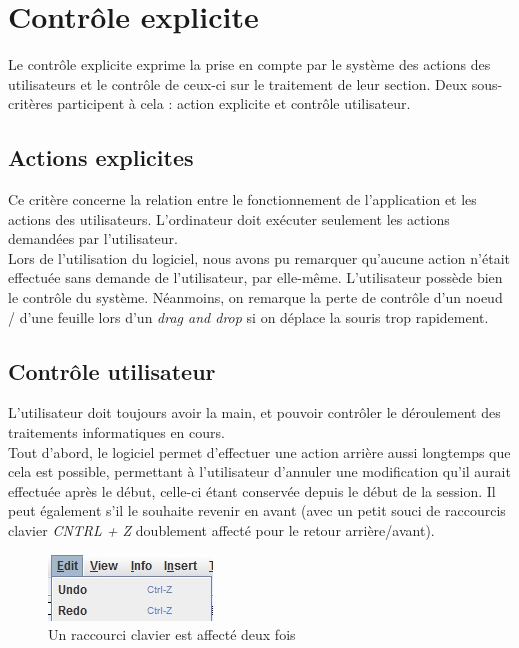 \documentclass[12pt, a4paper]{article}
\begin{document}
\section{Contrôle explicite}
Le contrôle explicite exprime la prise en compte par le système des actions des utilisateurs et le contrôle de ceux-ci sur le traitement de leur section. Deux sous-critères participent à cela : action explicite et contrôle utilisateur.
\subsection{Actions explicites}
Ce critère concerne la relation entre le fonctionnement de l'application et les actions des utilisateurs. L'ordinateur doit exécuter seulement les actions demandées par l'utilisateur.\\


Lors de l'utilisation du logiciel, nous avons pu remarquer qu'aucune action n'était effectuée sans demande de l'utilisateur, par elle-même. L'utilisateur possède bien le contrôle du système. Néanmoins, on remarque la perte de contrôle d'un noeud / d'une feuille lors d'un \emph{drag and drop} si on déplace la souris trop rapidement.

\subsection{Contrôle utilisateur}
L'utilisateur doit toujours avoir la main, et pouvoir contrôler le déroulement des traitements informatiques en cours. \\


Tout d'abord, le logiciel permet d'effectuer une action arrière aussi longtemps que cela est possible, permettant à l'utilisateur d'annuler une modification qu'il aurait effectuée après le début, celle-ci étant conservée depuis le début de la session. Il peut également s'il le souhaite revenir en avant (avec un petit souci de raccourcis clavier \emph{CNTRL + Z} doublement affecté pour le retour arrière/avant).

\begin{figure}[h]
\begin{center}
   \includegraphics[scale = 0.8]{ctrlz.jpg}
	\caption{Un raccourci clavier est affecté deux fois}
	\end{center}
\end{figure}
\end{document}
